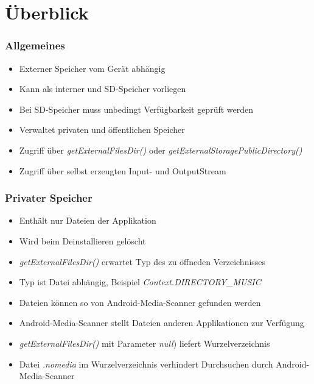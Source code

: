 \section{Überblick}
\begin{frame}
   \frametitle{Allgemeines}
   \begin{itemize}
      \item Externer Speicher vom Gerät abhängig
      \item Kann als interner und SD-Speicher vorliegen
      \item Bei SD-Speicher muss unbedingt Verfügbarkeit geprüft werden
      \item Verwaltet privaten und öffentlichen Speicher
      \item Zugriff über \emph{getExternalFilesDir()} oder \emph{getExternalStoragePublicDirectory()}
      \item Zugriff über selbst erzeugten Input- und OutputStream
   \end{itemize}
   
	
\end{frame}

\begin{frame}
   \frametitle{Privater Speicher}
   \begin{itemize}
   	\item Enthält nur Dateien der Applikation
   	\item Wird beim Deinstallieren gelöscht
      \item \emph{getExternalFilesDir()} erwartet Typ des zu öffneden Verzeichnisses
      \item Typ ist Datei abhängig, Beispiel \emph{Context.DIRECTORY\_MUSIC}
      \item Dateien können so von Android-Media-Scanner gefunden werden
      \item Android-Media-Scanner stellt Dateien anderen Applikationen zur Verfügung
      \item \emph{getExternalFilesDir()} mit Parameter \emph{null}) liefert 
      	Wurzelverzeichnis
      \item Datei \emph{.nomedia} im Wurzelverzeichnis verhindert Durchsuchen 
      	durch Android-Media-Scanner
   \end{itemize}
\end{frame}

